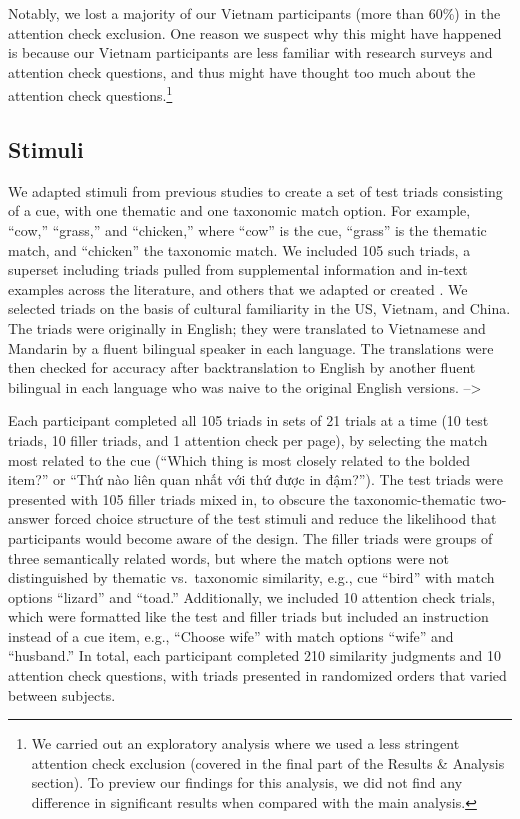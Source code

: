\documentclass[10pt, letterpaper]{article}
\begin{document}
Notably, we lost a majority of our Vietnam participants (more than 60\%)
in the attention check exclusion. One reason we suspect why this might
have happened is because our Vietnam participants are less familiar with
research surveys and attention check questions, and thus might have
thought too much about the attention check questions.\footnote{We
  carried out an exploratory analysis where we used a less stringent
  attention check exclusion (covered in the final part of the Results \&
  Analysis section). To preview our findings for this analysis, we did
  not find any difference in significant results when compared with the
  main analysis.}

\hypertarget{stimuli}{%
\subsection{Stimuli}\label{stimuli}}

We adapted stimuli from previous studies to create a set of test triads
consisting of a cue, with one thematic and one taxonomic match option.
For example, ``cow,'' ``grass,'' and ``chicken,'' where ``cow'' is the
cue, ``grass'' is the thematic match, and ``chicken'' the taxonomic
match. We included 105 such triads, a superset including triads pulled
from supplemental information and in-text examples across the
literature, and others that we adapted or created . We selected triads
on the basis of cultural familiarity in the US, Vietnam, and China. The
triads were originally in English; they were translated to Vietnamese
and Mandarin by a fluent bilingual speaker in each language. The
translations were then checked for accuracy after backtranslation to
English by another fluent bilingual in each language who was naive to
the original English versions. --\textgreater{}

Each participant completed all 105 triads in sets of 21 trials at a time
(10 test triads, 10 filler triads, and 1 attention check per page), by
selecting the match most related to the cue (``Which thing is most
closely related to the bolded item?'' or ``Thứ nào liên quan nhất với
thứ được in đậm?''). The test triads were presented with 105 filler
triads mixed in, to obscure the taxonomic-thematic two-answer forced
choice structure of the test stimuli and reduce the likelihood that
participants would become aware of the design. The filler triads were
groups of three semantically related words, but where the match options
were not distinguished by thematic vs.~taxonomic similarity, e.g., cue
``bird'' with match options ``lizard'' and ``toad.'' Additionally, we
included 10 attention check trials, which were formatted like the test
and filler triads but included an instruction instead of a cue item,
e.g., ``Choose wife'' with match options ``wife'' and ``husband.'' In
total, each participant completed 210 similarity judgments and 10
attention check questions, with triads presented in randomized orders
that varied between subjects.
\end{document}
